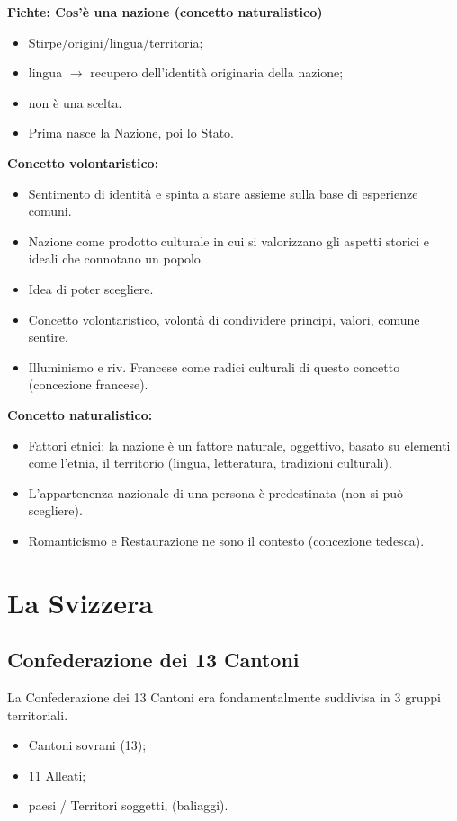 \documentclass[a4paper]{article}
\begin{document}
\textbf{Fichte: Cos'è una nazione (concetto naturalistico)}
\begin{itemize}
    \item Stirpe/origini/lingua/territoria;
    \item lingua \(\rightarrow\) recupero dell'identità originaria della nazione;
    \item non è una scelta.
    \item Prima nasce la Nazione, poi lo Stato.
\end{itemize}

\textbf{Concetto volontaristico:}
\begin{itemize}
    \item Sentimento di identità e spinta a stare assieme sulla base di esperienze comuni.
    \item Nazione come prodotto culturale in cui si valorizzano gli aspetti storici e ideali che connotano un popolo.
    \item Idea di poter scegliere.
    \item Concetto volontaristico, volontà di condividere principi, valori, comune sentire.
    \item Illuminismo e riv. Francese come radici culturali di questo concetto (concezione francese).
\end{itemize}

\textbf{Concetto naturalistico:}
\begin{itemize}
    \item Fattori etnici: la nazione è un fattore naturale, oggettivo, basato su elementi come l'etnia, il territorio (lingua, letteratura, tradizioni culturali).
    \item L'appartenenza nazionale di una persona è predestinata (non si può scegliere).
    \item Romanticismo e Restaurazione ne sono il contesto (concezione tedesca).
\end{itemize}

\pagebreak

\section{La Svizzera}

\subsection{Confederazione dei 13 Cantoni}

La Confederazione dei 13 Cantoni era fondamentalmente suddivisa in 3 gruppi territoriali.
\begin{itemize}
    \item Cantoni sovrani (13);
    \item 11 Alleati;
    \item paesi / Territori soggetti, (baliaggi).
\end{itemize}
\end{document}
